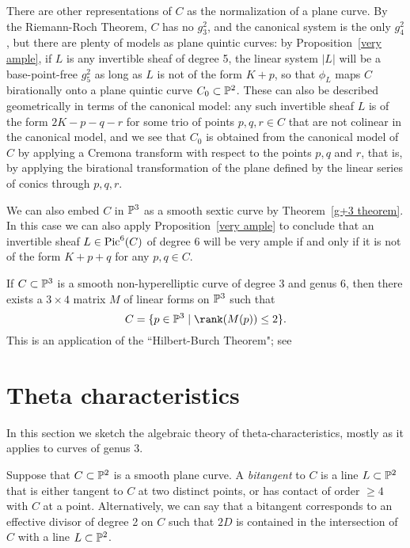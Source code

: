 There are other representations of $C$ as the normalization of a plane curve. By the Riemann-Roch Theorem, $C$ has no $g^2_3$, and the canonical system is the only $g^2_4$, but there are plenty of models as plane quintic curves: by Proposition~\ref{very ample}, if $L$ is any invertible sheaf of degree 5, the linear system $|L|$ will be a base-point-free $g^2_5$ as long as $L$ is not of the form $K+p$, so that $\phi_L$ maps $C$ birationally onto a plane quintic curve $C_0 \subset \PP^2$. These can also be described geometrically in terms of the canonical model: any such invertible sheaf $L$ is of the form $2K-p-q-r$ for some trio of  points $p, q, r \in C$ that are not colinear in the canonical model, and we see  that $C_0$ is obtained from the canonical model of $C$ by applying a Cremona transform with respect to the points $p, q$ and $r$, that is, by applying the birational transformation
of the plane defined by the linear series of conics through $p,q,r$.

We can also embed $C$ in $\PP^3$ as a smooth sextic curve by Theorem~\ref{g+3 theorem}. In this case we can also apply Proposition~\ref{very ample} to conclude that an invertible sheaf $L \in \pic^6(C)$ of degree 6 will be very ample if and only if it is not of the form $K+p+q$ for any $p, q \in C$. 

\begin{fact}
If $C \subset \PP^3$ is a smooth non-hyperelliptic curve of degree 3 and genus 6, then there exists a $3 \times 4$ matrix $M$ of linear forms on $\PP^3$ such that 
$$
C = \{ p \in \PP^3 \mid \rank(M(p)) \leq 2 \}.
$$
This is an application of the ``Hilbert-Burch Theorem"; see ~\cite{geomsyz}
\end{fact}

\section{Theta characteristics}

In this section we sketch the algebraic theory of theta-characteristics, mostly as it applies to curves of genus 3.

Suppose that $C \subset \PP^2$ is a smooth plane curve. A \emph{bitangent} to $C$ is a line $L \subset \PP^2$ that is either tangent to $C$ at two distinct points, or has contact of order $\geq 4$ with $C$ at a point. Alternatively, we can say that a bitangent  corresponds to an effective divisor of degree 2 on $C$ such that $2D$ is contained in the intersection of $C$ with a line $L \subset \PP^2$.

